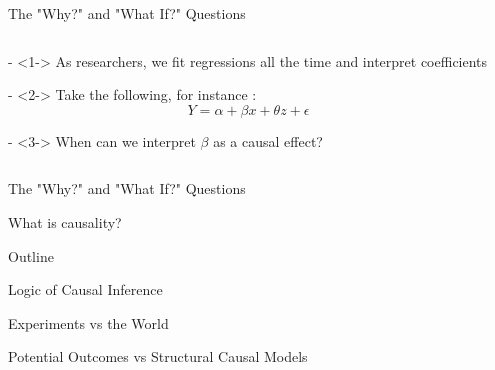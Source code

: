 \documentclass[notes,11pt, aspectratio=169, usenames, dvipsnames]{beamer}
\newenvironment{wideitemize}{\itemize\addtolength{\itemsep}{10pt}}{\enditemize}
\begin{document}
\begin{frame}{The "Why?" and "What If?" Questions}
\begin{columns}[T] %
\begin{column}{.58\textwidth}
  \begin{wideitemize}
    \item[-]<1-> As researchers, we fit regressions all the time and interpret coefficients
    \item[-]<2-> Take the following, for instance :
    $$
    Y = \alpha + \beta x + \theta z + \epsilon 
    $$
    
    \item[-]<3-> When can we interpret $\beta$ as a causal effect?
  \end{wideitemize}
\end{column}%
\hfill%
\begin{column}{.38\textwidth}
\end{column}%
\end{columns}
\end{frame}

\begin{frame}{The "Why?" and "What If?" Questions}
	\begin{center}
		{ \Huge What is causality?}
	\end{center}
\end{frame}

\begin{frame}{Outline}
	\begin{wideitemize}
		\item Logic of Causal Inference
		\item Experiments vs the World
		\item Potential Outcomes vs Structural Causal Models
	\end{wideitemize}
\end{frame}
\end{document}
